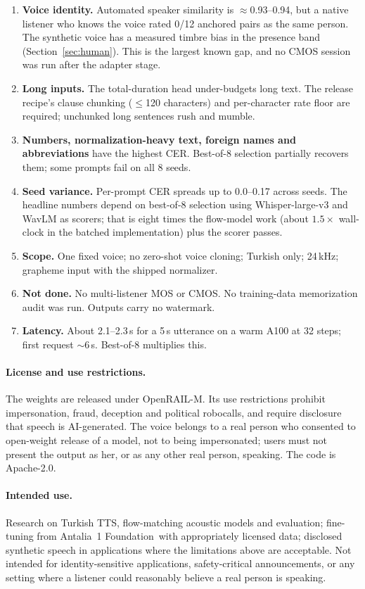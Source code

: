\documentclass[10pt,twocolumn]{article}
\newcommand{\foundation}{Antalia~1 Foundation}
\begin{document}
\begin{enumerate}
  \item \textbf{Voice identity.} Automated speaker similarity is $\approx$0.93--0.94, but a native listener who knows the voice rated 0/12 anchored pairs as the same person. The synthetic voice has a measured timbre bias in the presence band (Section~\ref{sec:human}). This is the largest known gap, and no CMOS session was run after the adapter stage.
  \item \textbf{Long inputs.} The total-duration head under-budgets long text. The release recipe's clause chunking ($\le$120 characters) and per-character rate floor are required; unchunked long sentences rush and mumble.
  \item \textbf{Numbers, normalization-heavy text, foreign names and abbreviations} have the highest CER. Best-of-8 selection partially recovers them; some prompts fail on all 8 seeds.
  \item \textbf{Seed variance.} Per-prompt CER spreads up to 0.0--0.17 across seeds. The headline numbers depend on best-of-8 selection using Whisper-large-v3 and WavLM as scorers; that is eight times the flow-model work (about $1.5\times$ wall-clock in the batched implementation) plus the scorer passes.
  \item \textbf{Scope.} One fixed voice; no zero-shot voice cloning; Turkish only; 24\,kHz; grapheme input with the shipped normalizer.
  \item \textbf{Not done.} No multi-listener MOS or CMOS. No training-data memorization audit was run. Outputs carry no watermark.
  \item \textbf{Latency.} About 2.1--2.3\,s for a 5\,s utterance on a warm A100 at 32 steps; first request $\sim$6\,s. Best-of-8 multiplies this.
\end{enumerate}

\paragraph{License and use restrictions.} The weights are released under OpenRAIL-M. Its use restrictions prohibit impersonation, fraud, deception and political robocalls, and require disclosure that speech is AI-generated. The voice belongs to a real person who consented to open-weight release of a model, not to being impersonated; users must not present the output as her, or as any other real person, speaking. The code is Apache-2.0.

\paragraph{Intended use.} Research on Turkish TTS, flow-matching acoustic models and evaluation; fine-tuning from \foundation\ with appropriately licensed data; disclosed synthetic speech in applications where the limitations above are acceptable. Not intended for identity-sensitive applications, safety-critical announcements, or any setting where a listener could reasonably believe a real person is speaking.
\end{document}
